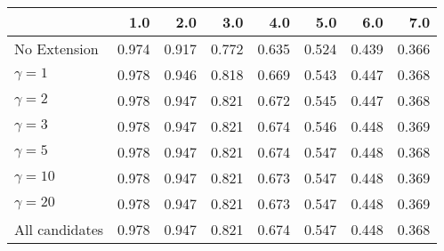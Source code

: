 \begin{tabular}{lrrrrrrr}
\toprule
{} &   1.0 &   2.0 &   3.0 &   4.0 &   5.0 &   6.0 &   7.0 \\
\midrule
No Extension   & 0.974 & 0.917 & 0.772 & 0.635 & 0.524 & 0.439 & 0.366 \\
$\gamma = 1$   & 0.978 & 0.946 & 0.818 & 0.669 & 0.543 & 0.447 & 0.368 \\
$\gamma = 2$   & 0.978 & 0.947 & 0.821 & 0.672 & 0.545 & 0.447 & 0.368 \\
$\gamma = 3$   & 0.978 & 0.947 & 0.821 & 0.674 & 0.546 & 0.448 & 0.369 \\
$\gamma = 5$   & 0.978 & 0.947 & 0.821 & 0.674 & 0.547 & 0.448 & 0.368 \\
$\gamma = 10$  & 0.978 & 0.947 & 0.821 & 0.673 & 0.547 & 0.448 & 0.369 \\
$\gamma = 20$  & 0.978 & 0.947 & 0.821 & 0.673 & 0.547 & 0.448 & 0.369 \\
All candidates & 0.978 & 0.947 & 0.821 & 0.674 & 0.547 & 0.448 & 0.368 \\
\bottomrule
\end{tabular}
